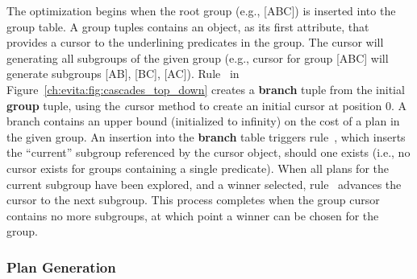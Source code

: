 The optimization begins when the root group (e.g., [ABC]) is inserted into the
group table.  A group tuples contains an object, as its first attribute, that
provides a cursor to the underlining predicates in the group.  The cursor will
generating all subgroups of the given group (e.g., cursor for group [ABC] will
generate subgroups [AB], [BC], [AC]).  Rule~ in
Figure~\ref{ch:evita:fig:cascades_top_down} creates a {\bf branch} tuple from
the initial {\bf group} tuple, using the {\emph cursor} method to create an
initial cursor at position $0$.  A branch contains an upper bound (initialized
to infinity) on the cost of a plan in the given group.  An insertion into the
{\bf branch} table triggers rule~, which inserts the ``current''
subgroup referenced by the cursor object, should one exists (i.e., no cursor
exists for groups containing a single predicate).  When all plans for the current 
subgroup have been explored, and a winner selected, rule~ advances the
cursor to the next subgroup.  This process completes when the group cursor contains
no more subgroups, at which point a winner can be chosen for the group.


\subsubsection{Plan Generation}

